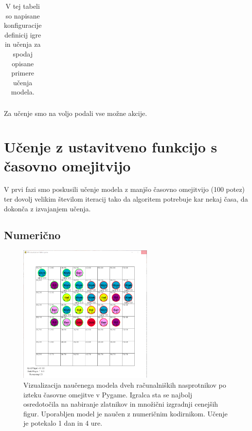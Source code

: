 \documentclass[a4paper, 12pt]{book}
\begin{document}
\begin{table}
\begin{center}
\begin{tabular}{p{0.4\linewidth}|p{0.1\linewidth}|p{0.1\linewidth}|p{0.1\linewidth}|p{0.1\linewidth}}
		\end{tabular}
	\end{center}
	\caption{V tej tabeli so napisane konfiguracije definicij igre in učenja za spodaj opisane primere učenja modela.}
	\label{tabelLearnConfig}
\end{table}

Za učenje smo na voljo podali vse možne akcije.

\section{Učenje z ustavitveno funkcijo s časovno omejitvijo}
\label{resultFirst}
V prvi fazi smo poskusili učenje modela z manjšo časovno omejitvijo (100 potez) ter dovolj velikim številom iteracij tako da algoritem potrebuje kar nekaj časa, da dokonča z izvajanjem učenja.


\subsection{Numerično}

\begin{figure}[h]
	\begin{center}
		\includegraphics[width=0.6\textwidth]{photos/first-numeric.pdf}
	\end{center}
	\caption{Vizualizacija naučenega modela dveh računalniških nasprotnikov po izteku časovne omejitve v Pygame. Igralca sta se najbolj osredotočila na nabiranje zlatnikov in množični izgradnji cenejših figur.
		Uporabljen model je naučen z numeričnim kodirnikom. Učenje je potekalo 1 dan in 4 ure.}
	\label{vizualizacijaRezultatovNumericniKodirnik100Timeout}
\end{figure}
\end{document}
